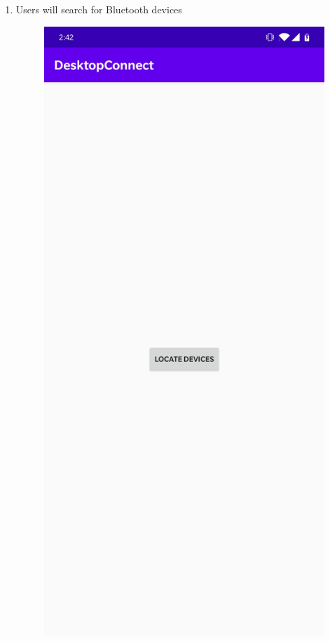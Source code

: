\documentclass{article}
\begin{document}
\begin{enumerate}
\item Users will search for Bluetooth devices

\begin{figure}[h]
\centering
\includegraphics[scale=.07]{./locate.jpg}
\end{figure}


\end{enumerate}
\end{document}
